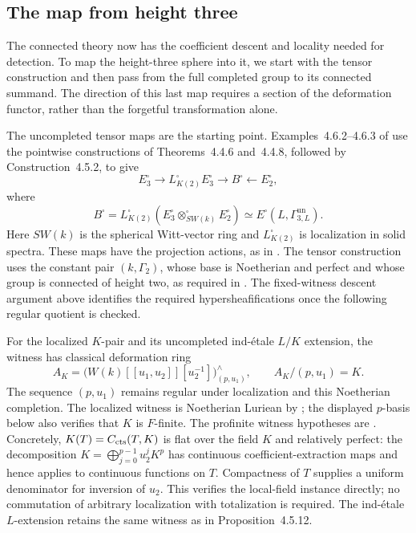 \subsection{The map from height three}

The connected theory now has the coefficient descent and locality needed
for detection. To map the height-three sphere into it, we start with the
tensor construction and then pass from the full completed group to its
connected summand. The direction of this last map requires a section of
the deformation functor, rather than the forgetful transformation alone.

The uncompleted tensor maps are the starting point. Examples~4.6.2--4.6.3 of
\cite{BMR2026} use the pointwise constructions of Theorems~4.4.6 and~4.4.8,
followed by Construction~4.5.2, to give
\[
 E_3^{\square}\longrightarrow L_{K(2)}^{\square}E_3^{\square}
   \longrightarrow B^{\square}\longleftarrow E_2^{\square},
\]
where
\[
 B^{\square}
 =L_{K(2)}^{\square}
    (E_3^{\square}\otimes_{SW(k)}^{\square}E_2^{\square})
 \simeq E^{\square}(L,\Gamma^{\mathrm{un}}_{3,L}).
\]
Here \(SW(k)\) is the spherical Witt-vector ring and
\(L_{K(2)}^{\square}\) is localization in solid spectra. These maps have
the projection actions, as in \cite[(5.2.2)--(5.2.3)]{BMR2026}.
The tensor construction uses the constant pair \((k,\Gamma_2)\), whose
base is Noetherian and perfect and whose group is connected of height
two, as required in \cite[Construction~4.4.7]{BMR2026}. The fixed-witness
descent argument above identifies the required hypersheafifications once
the following regular quotient is checked.

For the localized $K$-pair and its uncompleted ind-\'{e}tale $L/K$
extension, the witness has classical deformation ring
\[
 A_K=\bigl(W(k)[[u_1,u_2]][u_2^{-1}]\bigr)^{\wedge}_{(p,u_1)},
 \qquad A_K/(p,u_1)=K.
\]
The sequence $(p,u_1)$ remains regular under localization and this
Noetherian completion. The localized witness is Noetherian Luriean
by \cite[Proposition~4.4.4 and Remark~4.2.2]{BMR2026}; the displayed
$p$-basis below also verifies that $K$ is $F$-finite. The profinite witness hypotheses are
\cite[Propositions~4.5.9, 4.5.10, and 4.5.12, Definition~4.5.11,
and Examples~4.6.1--4.6.3]{BMR2026}.
Concretely, $K(T)=C_{\mathrm{cts}}(T,K)$ is flat over the field $K$ and
relatively perfect: the decomposition
$K=\bigoplus_{j=0}^{p-1}u_2^jK^p$ has continuous coefficient-extraction
maps and hence applies to continuous functions on $T$.
Compactness of $T$ supplies a uniform denominator for inversion of
$u_2$.  This verifies the local-field instance directly; no commutation
of arbitrary localization with totalization is required.
The ind-\'{e}tale $L$-extension retains the same witness as in
Proposition~4.5.12.

